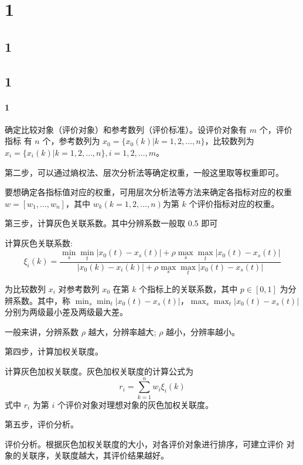 \documentclass[withoutpreface,bwprint,draft]{cumcmthesis}
\begin{document}
\section{1}
\subsection{1}
\subsection{1}
\paragraph{1}
确定比较对象（评价对象）和参考数列（评价标准）。设评价对象有 $m$ 个，评价指标
有 $n$ 个，参考数列为 $x_0 = \{x_0(k)|k=1,2,\dots,n\}$，比较数列为 $x_i = 
\{x_i(k)|k=1,2,\dots,n\}, i=1,2,\dots,m$。

第二步，可以通过熵权法、层次分析法等确定权重，一般这里取等权重即可。

要想确定各指标值对应的权重，可用层次分析法等方法来确定各指标对应的权重 $w = 
[w_1,\dots,w_n]$，其中 $w_k(k = 1,2,\dots,n)$为第 $k$ 个评价指标对应的权重。

第三步，计算灰色关联系数。其中分辨系数一般取 0.5 即可

计算灰色关联系数:
\[
    \xi_i(k)=\frac{\displaystyle \min_s\min_t|x_0(t)-x_s(t)|+\rho\max_s
    \max_t|x_0(t)-x_s(t)|}{\displaystyle |x_0(k)-x_i(k)|+\rho\max_s
    \max_t|x_0(t)-x_s(t)|}
\]

为比较数列 $x_i$ 对参考数列 $x_0$ 在第 $k$ 个指标上的关联系数，其中 $p\in[0,1]$ 
为分辨系数。其中，称 $\min_s\min_t|x_0(t)-x_s(t)|$，$\max_s\max_t|x_0(t)-
x_s(t)|$ 分别为两级最小差及两级最大差。

一般来讲，分辨系数 $\rho$ 越大，分辨率越大; $\rho$ 越小，分辨率越小。

第四步，计算加权关联度。

计算灰色加权关联度。灰色加权关联度的计算公式为
\[
    r_i=\sum_{k=1}^nw_i\xi_i (k)
\]
式中 $r_i$ 为第 $i$ 个评价对象对理想对象的灰色加权关联度。

第五步，评价分析。

评价分析。根据灰色加权关联度的大小，对各评价对象进行排序，可建立评价
对象的关联序，关联度越大，其评价结果越好。
\end{document}
